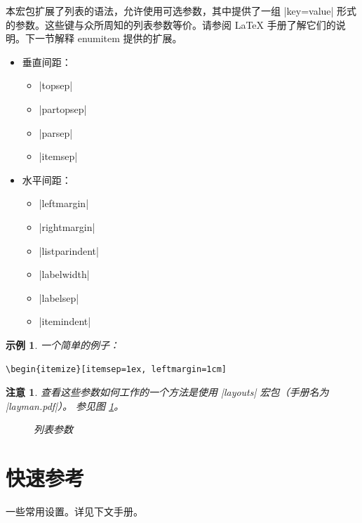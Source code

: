 \documentclass[a4paper]{ltxguide}
\newtheorem{note}{注意}
\newtheorem{example}{示例}
\begin{document}
本宏包扩展了列表的语法，允许使用可选参数，其中提供了一组 |key=value| 形式的参数。这些键与众所周知的列表参数等价。请参阅 \LaTeX{} 手册了解它们的说明。下一节解释 \textsf{enumitem} 提供的扩展。
\begin{itemize}
\item
垂直间距：
\begin{itemize}
\setlength{\itemsep}{0pt}
\item |topsep|
\item |partopsep|
\item |parsep|
\item |itemsep|
\end{itemize}
\item
水平间距：
\begin{itemize}
\setlength{\itemsep}{0pt}
\item |leftmargin|
\item |rightmargin|
\item |listparindent|
\item |labelwidth|
\item |labelsep|
\item |itemindent|
\end{itemize}
\end{itemize}

\begin{example}
  一个简单的例子：
\begin{verbatim}
\begin{itemize}[itemsep=1ex, leftmargin=1cm]
\end{verbatim}
\end{example}

\begin{note}
  查看这些参数如何工作的一个方法是使用 |layouts| 宏包（手册名为 |layman.pdf|）。
  \ifx\listdiagram\notundefined\else
    参见图 \ref{f.drawlist}。
    \begin{figure}
      \centering
      \listdiagram
      \caption{列表参数}\label{f.drawlist}
    \end{figure}
  \fi
\end{note}

\section{快速参考}

一些常用设置。详见下文手册。
\end{document}
